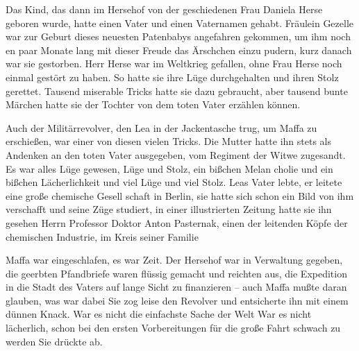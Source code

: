 Das Kind, das dann im Hersehof von der geschiedenen Frau
Daniela Herse geboren wurde, hatte einen Vater und einen
Vaternamen gehabt. Fräulein Gezelle war zur Geburt dieses
neuesten Patenbabys angefahren gekommen, um ihm noch
en paar Monate lang mit dieser Freude das Ärschchen einzu\-%
pudern, kurz danach war sie gestorben. Herr Herse war im
Weltkrieg gefallen, ohne Frau Herse noch einmal gestört zu
haben. So hatte sie ihre Lüge durchgehalten und ihren Stolz
gerettet. Tausend miserable Tricks hatte sie dazu gebraucht,
aber tausend bunte Märchen hatte sie der Tochter von dem
toten Vater erzählen können.

Auch der Militärrevolver, den Lea in der Jackentasche trug,
um Maffa zu erschießen, war einer von diesen vielen Tricks.
Die Mutter hatte ihn stets als Andenken an den toten Vater
ausgegeben, vom Regiment der Witwe zugesandt. Es war
alles Lüge gewesen, Lüge und Stolz, ein bißchen Melan\-%
cholie und ein bißchen Lächerlichkeit und viel Lüge und viel
Stolz. Leas Vater lebte, er leitete eine große chemische Gesell\-%
schaft in Berlin, sie hatte sich schon ein Bild von ihm verschafft
und seine Züge studiert, in einer illustrierten Zeitung hatte sie
ihn gesehen\dopp{} Herrn Professor Doktor Anton Pasternak, einen
der leitenden Köpfe der chemischen Industrie, im Kreis seiner
Familie\punkte

Maffa war eingeschlafen, es war Zeit. Der Hersehof war in
Verwaltung gegeben, die geerbten Pfandbriefe waren flüssig
gemacht und reichten aus, die Expedition in die Stadt des
Vaters auf lange Sicht zu finanzieren -- auch Maffa mußte
daran glauben, was war dabei\ausr{} Sie zog leise den Revolver
und entsicherte ihn mit einem dünnen Knack. War es nicht die
einfachste Sache der Welt\frag{} War es nicht lächerlich, schon bei
den ersten Vorbereitungen für die große Fahrt schwach zu
werden\frag{} Sie drückte ab.

